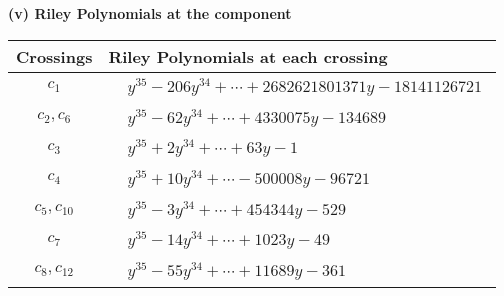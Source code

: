 \documentclass[1p]{elsarticle_modified}
\theoremstyle{definition}
\begin{document}
\newpage\renewcommand{\arraystretch}{1}
\flushleft \textbf{(v) Riley Polynomials at the component}\newline \\
\begin{tabular}{m{50pt}|m{274pt}}
Crossings & \hspace{64pt}Riley Polynomials at each crossing \\
\hline $$\begin{aligned}c_{1}\end{aligned}$$&$\begin{aligned}
&y^{35}-206 y^{34}+\cdots+2682621801371 y-18141126721
\end{aligned}$\\
\hline $$\begin{aligned}c_{2},c_{6}\end{aligned}$$&$\begin{aligned}
&y^{35}-62 y^{34}+\cdots+4330075 y-134689
\end{aligned}$\\
\hline $$\begin{aligned}c_{3}\end{aligned}$$&$\begin{aligned}
&y^{35}+2 y^{34}+\cdots+63 y-1
\end{aligned}$\\
\hline $$\begin{aligned}c_{4}\end{aligned}$$&$\begin{aligned}
&y^{35}+10 y^{34}+\cdots-500008 y-96721
\end{aligned}$\\
\hline $$\begin{aligned}c_{5},c_{10}\end{aligned}$$&$\begin{aligned}
&y^{35}-3 y^{34}+\cdots+454344 y-529
\end{aligned}$\\
\hline $$\begin{aligned}c_{7}\end{aligned}$$&$\begin{aligned}
&y^{35}-14 y^{34}+\cdots+1023 y-49
\end{aligned}$\\
\hline $$\begin{aligned}c_{8},c_{12}\end{aligned}$$&$\begin{aligned}
&y^{35}-55 y^{34}+\cdots+11689 y-361
\end{aligned}$\\

\end{tabular}
\end{document}
